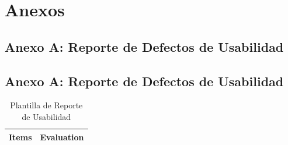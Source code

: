 \documentclass[stu, 12pt, letterpaper, donotrepeattitle, floatsintext, natbib]{apa7}
\begin{document}
\newpage
\section{\large Anexos}
\label{sec:anexos}

\subsection{Anexo A: Reporte de Defectos de Usabilidad}



\clearpage
\subsection{Anexo A: Reporte de Defectos de Usabilidad}

\begin{longtable}{|>{\raggedright\arraybackslash}p{10cm}|>{\centering\arraybackslash}p{3cm}|}
    \caption{Plantilla de Reporte de Usabilidad} \label{tab:reporte_usabilidad} \\
    \hline
    \textbf{Items} & \textbf{Evaluation} \\ \hline
    

\end{longtable}
\end{document}
